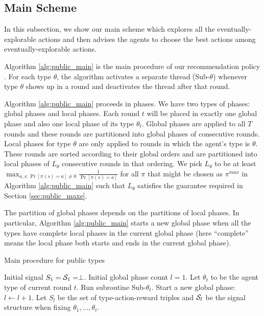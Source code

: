 \subsection{Main Scheme}
\label{sec:public_main}
In this subsection, we show our main scheme which explores all the eventually-explorable actions and then advises the agents to choose the best actions among eventually-explorable actions.

Algorithm \ref{alg:public_main} is the main procedure of our recommendation policy . For each type $\theta$, the algorithm activates a separate thread (Sub-$\theta$) whenever type $\theta$ shows up in a round and deactivates the thread after that round. 

Algorithm \ref{alg:public_main} proceeds in phases. We have two types of phases: global phases and local phases. Each round $t$ will be placed in exactly one global phase and also one local phase of its type $\theta_t$. Global phases are applied to all $T$ rounds and these rounds are partitioned into global phases of consecutive rounds. Local phases for type $\theta$ are only applied to rounds in which the agent's type is $\theta$. These rounds are sorted according to their global orders and are partitioned into local phases of $L_\theta$ consecutive rounds in that ordering. We pick $L_{\theta}$ to be at least $\max_{a,s: \Pr[\pi(s)=a] \neq 0} \frac{1}{\Pr[\pi(s)=a]}$ for all $\pi$ that might be chosen as $\pi^{max}$ in Algorithm \ref{alg:public_main} such that $L_{\theta}$ satisfies the guarantee required in Section \ref{sec:public_maxe}.

The partition of global phases depends on the partitions of local phases. In particular, Algorithm \ref{alg:public_main} starts a new global phase when all the types have complete local phases in the current global phase (here ``complete'' means the local phase both starts and ends in the current global phase). 
 \begin{algorithm}[H]
    \caption{Main procedure for public types }
    	\label{alg:public_main}
    \begin{algorithmic}[1]
    	\STATE Initial signal $S_1 = \S_1 = \perp$.
	\STATE Initial global phase count $l = 1$.
		\STATE Let $\theta_t$ to be the agent type of current round $t$. Run subroutine Sub-$\theta_t$.
			\STATE Start a new global phase:
			\STATE $l \leftarrow l + 1$.
			\STATE Let $S_l$ be the set of type-action-reward triples and $\S_l$ be the signal structure when fixing $\theta_1,...,\theta_t$.
		\ENDIF
	\ENDFOR
     \end{algorithmic}
\end{algorithm}

